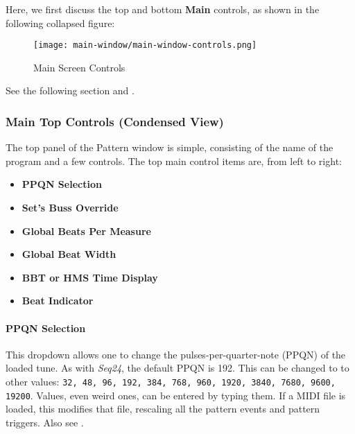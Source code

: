 \documentclass[
 11pt,
 twoside,
 a4paper,
 final                                 %
]{article}
\begin{document}
   Here, we first discuss the top and bottom \textbf{Main} controls, as
   shown in the following collapsed figure:

\begin{figure}[H]
   \centering 
   \texttt{[image: main-window/main-window-controls.png]}
   \caption{Main Screen Controls}
   \label{fig:main_screen_controls}
\end{figure}

   See the following section and
   .

\subsubsection{Main Top Controls (Condensed View)}
\label{subsubsec:introduction_main_top_controls}

   The top panel of the Pattern window is simple, consisting of the
   name of the program and a few controls.
   The top main control items are, from left to right:

   \begin{itemize}
      \item \textbf{PPQN Selection}
      \item \textbf{Set's Buss Override}
      \item \textbf{Global Beats Per Measure}
      \item \textbf{Global Beat Width}
      \item \textbf{BBT or HMS Time Display}
      \item \textbf{Beat Indicator}
   \end{itemize}


\paragraph{PPQN Selection}
\label{paragraph:introduction_ppqn_selection}

   This dropdown allows one to change the pulses-per-quarter-note (PPQN) of the
   loaded tune.
   As with \textsl{Seq24}, the default PPQN is 192.  This can be changed to
   to other values:
   \texttt{32, 48, 96, 192, 384, 768, 960, 1920, 3840, 7680, 9600,
   19200}.
   Values, even weird ones, can be entered by typing them.
   If a MIDI file is loaded, this modifies that file, rescaling all the
   pattern events and pattern triggers.
   Also see .
\end{document}
